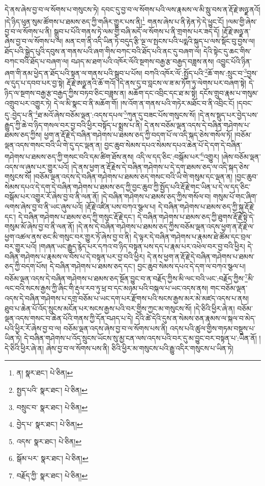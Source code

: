 དེ་ནས་ཞེས་བྱ་བ་ལ་སོགས་པ་གསུངས་ཏེ། དབང་དུ་བྱ་བ་ལ་སོགས་པའི་ལས་རྣམས་ལ་མི་སླུ་བས་ན་རྡོ་རྗེ་ཨཉྫ་ནའོ། །དེ་ཉིད་ཕུན་སུམ་ཚོགས་པ་ཐམས་ཅད་ཀྱི་གཞིར་གྱུར་པས་ནི།\footnote{ན།  སྣར་ཐང་།  པེ་ཅིན། } གནས་ཞེས་པ་ནི་རྟེན་ཏེ་དེ་ཕྱུང་ངོ། །ལམ་གྱི་ཞེས་བྱ་བ་ལ་སོགས་པ་ནི། སྒྲུབ་པ་པོའི་གནས་ཏེ་ལམ་གྱི་བཞི་མདོ་ལ་སོགས་པ་ནི་གྲགས་པར་ཟད་དོ། །རྡོ་རྗེ་ཨཉྫ་ན་ཞེས་བྱ་བ་ལ་སོགས་པ་ལ། མན་ངག་ནི་འདི་ཡིན་ཏེ་བདུད་རྩི་ལྔ་ལ་སྤངས་པའི་པདྨའི་སྐུད་པ་ལས་སྡོང་བུ་བྱས་ལ། ཐོད་པའི་སྒྱེད་པུའི་དབུས་ན་གནས་པའི་ཞག་གིས་བཀང་བའི་ཐོད་པའི་ནང་དུ་བཞག་ལ། དེའི་སྟེང་དུ་ཆང་གིས་བཀང་བའི་ཐོད་པ་བཞག་ལ། བཤད་མ་ཐག་པའི་འཁོར་ལོའི་སྔགས་བརྒྱ་རྩ་བརྒྱད་བཟླས་ནས། འབྱུང་པོའི་ཉིན་ཞག་གི་ནམ་ཕྱེད་ན་ཐོད་པའི་སྟན་ལ་གནས་པའི་སྒྲུབ་པ་པོས། བཀའི་འཁོར་ལོ་:སྤྱོད་པའི་\footnote{སྤྱད་པའི་  སྣར་ཐང་།  པེ་ཅིན། }ཆོ་གས་:སྲུང་བ་\footnote{བསྲུང་བ་  སྣར་ཐང་།  པེ་ཅིན། }བྱས་ལ་དུད་པ་དབབ་པར་བྱ་སྟེ། རྡོ་རྗེ་ཨཉྫ་ནའི་ཆོ་གའོ། །དེ་ནས་དུ་བ་བླངས་ལ་ཟ་མ་ཏོག་ཏུ་ལེགས་པར་བཞག་སྟེ། དེ་ཉིད་ལ་སྔགས་བརྒྱ་རྩ་བརྒྱད་ཀྱིས་བཏབ་ཅིང་བཟླས་ན། མཆོག་དང་འབྲིང་དང་ཐ་མ་སྟེ། དངོས་གྲུབ་རྣམ་པ་གསུམ་འགྲུབ་པར་འགྱུར་ཏེ། དེ་ལ་མི་སྣང་བ་ནི་མཆོག་གོ། །ས་འོག་ན་གནས་པའི་གཏེར་མཐོང་བ་ནི་འབྲིང་ངོ། །དབང་དུ་:བྱེད་པ་ནི་\footnote{བྱེད་པ་  སྣར་ཐང་།  པེ་ཅིན། }ཐ་མའོ་ཞེས་བཅོམ་ལྡན་:འདས་དཔལ་\footnote{འདས་  སྣར་ཐང་།  པེ་ཅིན། }ཀུན་དུ་བཟང་པོས་གསུངས་སོ། །དེ་ནས་སྡུད་པར་བྱེད་པས་རྒྱུད་ཀྱི་ཆེ་བ་ཉིད་གསལ་བར་བྱ་བའི་ཕྱིར་བསྟོད་པ་སྨྲས་པ་ནི། དེ་ནས་བཅོམ་ལྡན་འདས་དེ་བཞིན་གཤེགས་པ་ཐམས་ཅད་ཀྱིས། ཕྱག་ན་རྡོ་རྗེ་དེ་བཞིན་གཤེགས་པ་ཐམས་ཅད་ཀྱི་བདག་པོ་ལ་འདི་སྐད་ཅེས་གསོལ་ཏོ། །བཅོམ་ལྡན་འདས་གསང་བའི་ཡི་གེ་དུ་དང་ལྡན་ན། བྱང་ཆུབ་སེམས་དཔའ་སེམས་དཔའ་ཆེན་པོ་དེ་དག་དེ་བཞིན་གཤེགས་པ་ཐམས་ཅད་ཀྱི་གསང་བའི་དམ་ཚིག་ཐོས་ནས། འདི་ལ་དད་ཅིང་:བསྒོམ་པར་\footnote{སྒོམ་པར་  སྣར་ཐང་།  པེ་ཅིན། }འགྱུར། །ཞེས་བཅོམ་ལྡན་འདས་ལ་ཞུས་པར་གྱུར་པའོ། །དེ་ནས་ཕྱག་ན་རྡོ་རྗེས་དེ་བཞིན་གཤེགས་པ་དེ་དག་ཐམས་ཅད་ལ་འདི་སྐད་ཅེས་གསུངས་སོ། །བཅོམ་ལྡན་འདས་དེ་བཞིན་གཤེགས་པ་ཐམས་ཅད་གསང་བའི་ཡི་གེ་གསུམ་དང་ལྡན་ན། །བྱང་ཆུབ་སེམས་དཔའ་དེ་དག་དེ་བཞིན་གཤེགས་པ་ཐམས་ཅད་ཀྱི་བྱང་ཆུབ་ཀྱི་སྤྱོད་པའི་རྡོ་རྗེ་གང་ཡིན་པ་དེ་ལ་དད་ཅིང་བསྒོམ་པར་འགྱུར་རོ་ཞེས་བྱ་བ་ནི་ལན་ནོ། །དེ་བཞིན་གཤེགས་པ་ཐམས་ཅད་ཀྱིས་གསོལ་བ། གསུམ་པོ་གང་ཞིག་ལགས་ཞེས་བྱ་བ་ནི་ཡང་ཞུས་པའོ། །རྡོ་རྗེ་འཛིན་པས་བཀའ་སྩལ་པ། དེ་བཞིན་གཤེགས་པ་ཐམས་ཅད་ཀྱི་སྐུ་རྡོ་རྗེ་དང་། དེ་བཞིན་གཤེགས་པ་ཐམས་ཅད་ཀྱི་གསུང་རྡོ་རྗེ་དང་། དེ་བཞིན་གཤེགས་པ་ཐམས་ཅད་ཀྱི་ཐུགས་རྡོ་རྗེ་སྟེ་དེ་གསུམ་མོ་ཞེས་བྱ་བ་ནི་ལན་ནོ། །དེ་ནས་དེ་བཞིན་གཤེགས་པ་ཐམས་ཅད་ཀྱིས་བཅོམ་ལྡན་འདས་ཕྱག་ན་རྡོ་རྗེ་ལ་ཕྱག་འཚལ་ནས་ཅང་མི་གསུང་བར་གྱུར་ཏོ་ཞེས་བྱ་བ་ནི། དེ་ལྟར་དེ་བཞིན་གཤེགས་པ་རྣམས་ཐེ་ཚོམ་དང་བྲལ་བར་གྱུར་པའོ། །གཞན་ཡང་རྒྱུད་རྙེད་པར་དཀའ་བ་ཉིད་བསྟན་པས་དད་པ་རྣམ་པར་འཕེལ་བར་བྱ་བའི་ཕྱིར། དེ་བཞིན་གཤེགས་པ་རྣམས་ལ་བོས་པ་དེ་བསྟན་པར་བྱ་བའི་ཕྱིར། དེ་ནས་ཕྱག་ན་རྡོ་རྗེ་དེ་བཞིན་གཤེགས་པ་ཐམས་ཅད་ཀྱི་བདག་པོས། དེ་བཞིན་གཤེགས་པ་ཐམས་ཅད་དང་། བྱང་ཆུབ་སེམས་དཔའ་དེ་དག་ལ་བཀའ་སྩལ་པ། བཅོམ་ལྡན་འདས་དེ་བཞིན་གཤེགས་པ་ཐམས་ཅད་སྔོན་བྱུང་བ་ན་བརྗོད་ཀྱིས་མི་ལང་བའི་ཡང་:བརྗོད་ཀྱིས་\footnote{བརྗོད་ཀྱི་  སྣར་ཐང་།  པེ་ཅིན། }མི་ལང་བའི་སངས་རྒྱས་ཀྱི་ཞིང་གི་རྡུལ་རབ་ཏུ་ཕྲ་བ་དང་མཉམ་པའི་བསྐལ་པ་ཡང་འདས་ནས། གང་བཅོམ་ལྡན་འདས་དེ་བཞིན་གཤེགས་པ་དགྲ་བཅོམ་པ་ཡང་དག་པར་རྫོགས་པའི་སངས་རྒྱས་མར་མེ་མཛད་འདས་པ་ནས། ཐུབ་པ་ཆེན་པོ་འོད་སྲུངས་མངོན་པར་སངས་རྒྱས་པའི་བར་གྱིས་ཀྱང་མ་གསུངས་སོ། །དེ་ཅིའི་ཕྱིར་ཞེ་ན། བཅོམ་ལྡན་འདས་གསང་བ་ཆེན་པོའི་གནས་ཀྱི་དོན་བཤད་པ་དེ། དེའི་ཚེ་དེའི་དུས་ན་སེམས་ཅན་རྣམས་ལ་སྐལ་བ་མེད་པའི་ཕྱིར་རོ་ཞེས་བྱ་བ་ལ། བཅོམ་ལྡན་འདས་ཞེས་བྱ་བ་ལ་སོགས་པས་ནི། འདས་པའི་ཚུལ་གྱིས་གཏམ་བསྡུས་པ་ཡིན་ཏེ། དེ་བཞིན་གཤེགས་པ་འོད་སྲུངས་ཡོངས་སུ་མྱ་ངན་ལས་འདས་པའི་བར་དུ་མ་བྱུང་བར་བསྟན་པ་:ཡིན་ནོ། །དེ་ཅིའི་ཕྱིར་ཞེ་ན། ཞེས་བྱ་བ་ལ་སོགས་པས་ནི། ཅིའི་ཕྱིར་མ་གསུངས་པའི་རྒྱུ་འདིར་གསུངས་པ་ཡིན་ཏེ། 